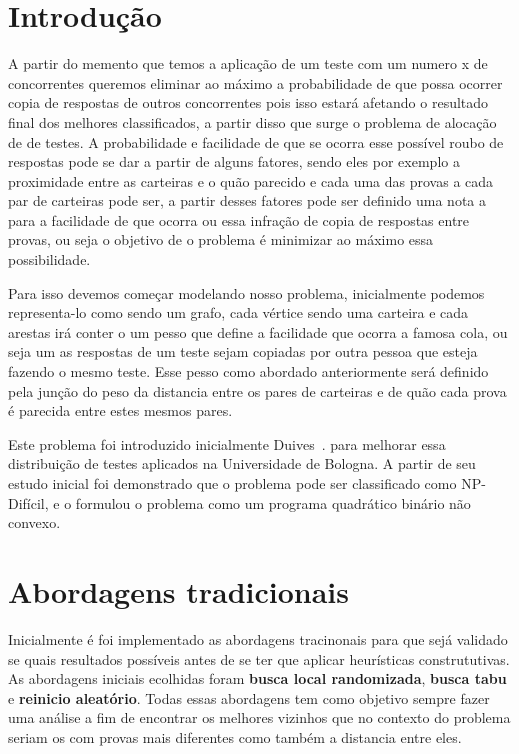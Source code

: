 \documentclass[a4paper,11pt]{article}
\begin{document}
 
\newpage
\section{Introdu\c{c}\~ao} 
 
A partir do memento que temos a aplica\c c\~ao de um teste com um numero x de concorrentes queremos eliminar ao m\'aximo a probabilidade de que possa ocorrer copia de respostas de outros concorrentes 
pois isso estar\'a afetando o resultado final dos melhores classificados, a partir disso que surge o problema de aloca\c c\~ao de de testes. 
A probabilidade e facilidade de que se ocorra esse poss\'ivel roubo de respostas pode se dar a partir de alguns fatores,
sendo eles por exemplo a proximidade entre as carteiras e o qu\~ao parecido e cada uma das provas a cada par de carteiras pode ser, a partir desses fatores pode ser 
definido uma nota a para a facilidade de que ocorra ou essa infra\c c\~ao de copia de respostas entre provas, ou seja o objetivo de o problema \'e minimizar ao m\'aximo
essa possibilidade. 

Para isso devemos come\c car modelando nosso problema, inicialmente podemos representa-lo como sendo um grafo, cada v\'ertice sendo uma carteira e cada arestas ir\'a conter
o um pesso que define a facilidade que ocorra a famosa cola, ou seja um as respostas de um teste sejam copiadas por outra pessoa que esteja fazendo o mesmo teste. Esse pesso como
abordado anteriormente ser\'a definido pela jun\c c\~ao do peso da distancia entre os pares de carteiras e de qu\~ao cada prova \'e parecida entre estes mesmos pares.

Este problema foi introduzido inicialmente Duives~\citep{duives:13}. para melhorar essa distribui\c c\~ao de testes aplicados na Universidade de Bologna. A partir de seu estudo inicial foi demonstrado que o 
problema pode ser classificado como NP-Dif\'icil, e o formulou o problema como um programa quadr\'atico bin\'ario n\~ao convexo.

\section{Abordagens tradicionais}

Inicialmente \'e foi implementado as abordagens tracinonais para que sej\'a validado se quais resultados poss\'iveis antes de se ter que aplicar heur\'isticas constrututivas. As abordagens iniciais ecolhidas foram \textbf{busca local randomizada}, \textbf{busca tabu} e  \textbf{reinicio aleat\'orio}. Todas essas abordagens tem como objetivo sempre fazer uma an\'alise a fim de encontrar os melhores vizinhos que no contexto do problema seriam os com provas mais diferentes como tamb\'em a distancia entre eles.
\end{document}
